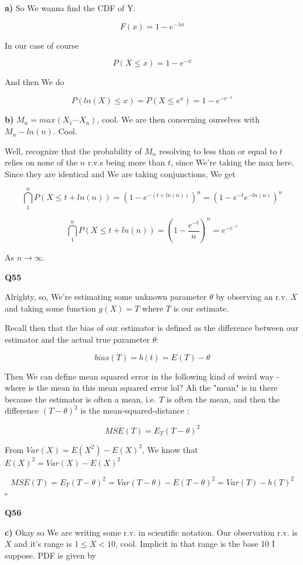 \documentclass{article}
\newcommand{\qed}{\hfill$\square$}
\begin{document}
			\textbf{a)} So We wanna find the CDF of Y.
			
			\[ F(x) = 1-e^{-\lambda x} \]	
			
			In our case of course
			
			\[ P(X \le x) = 1-e^{-x} \]	
			
			And then We do
			
			\[ P(ln(X) \le x) = P(X \le e^x) =  1-e^{-{e^{-x}}} \]	
			
			\textbf{b)} $M_n = max(X_1\cdots X_n)$, cool. We are then concerning ourselves with $M_n - ln(n)$. Cool.
			
			Well, recognize that the probability of $M_n$ resolving to less than or equal to $t$ relies on none of the $n$ r.v.s being more than $t$, since We're taking the max here. Since they are identical and We are taking conjunctions, We get
			
			\[ \bigcap^n_1 P(X \le t + ln(n)) = (1-e^{-(t+ln(n))})^n = (1-e^{-t}e^{-ln(n)})^n \]
			
			\[ \bigcap^n_1 P(X \le t + ln(n)) = \left(1-\frac{e^{-t}}{n}\right)^n = e^{-e^{-t}}\]
			
			As $n\to\infty$.
			
			\hfill
			
		\textbf{Q55}
		
			Alrighty, so, We're estimating some unknown parameter $\theta$ by observing an r.v. $X$ and taking some function $g(X) = T$ where $T$ is our estimate.
			
			Recall then that the bias of our estimator is defined as the difference between our estimator and the actual true parameter $\theta$:
			
			\[ bias(T) = b(t) = E(T) - \theta \]
			
			Then We can define mean squared error in the following kind of weird way - where is the mean in this mean squared error lol? Ah the "mean" is in there because the estimator is often a mean, i.e. $T$ is often the mean, and then the difference $(T-\theta)^2$ is the mean-squared-distance :
			
			\[ MSE(T) = E_T(T-\theta)^2 \]
			
			From $Var(X) = E(X^2) - E(X)^2$, We know that $E(X)^2 = Var(X) - E(X)^2$			
			
			\[ MSE(T) = E_T(T-\theta)^2 = Var(T-\theta) - E(T-\theta)^2 = Var(T) - b(T)^2 \]\qed
			
			\hfill
			
		\textbf{Q56}
		
			\textbf{c)} Okay so We are writing some r.v. in scientific notation. Our observation r.v. is $X$ and it's range is $1\le X < 10$, cool. Implicit in that range is the base 10 I suppose. PDF is given by
			
\end{document}
